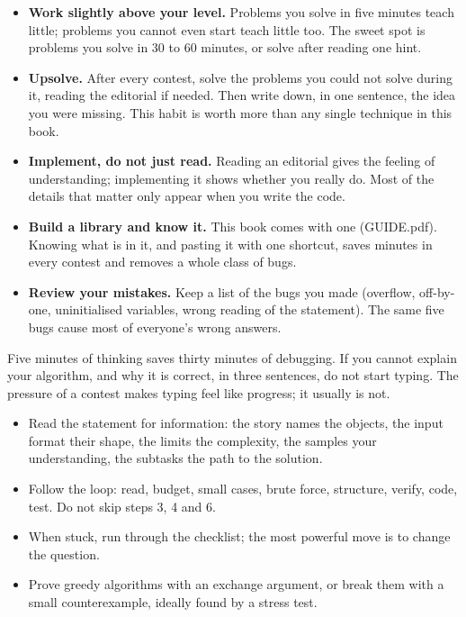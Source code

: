 \begin{itemize}
  \item \textbf{Work slightly above your level.} Problems you solve in five minutes teach little; problems you cannot even
        start teach little too. The sweet spot is problems you solve in 30 to 60 minutes, or solve after reading one hint.
  \item \textbf{Upsolve.} After every contest, solve the problems you could not solve during it, reading the editorial if
        needed. Then write down, in one sentence, the idea you were missing. This habit is worth more than any single
        technique in this book.
  \item \textbf{Implement, do not just read.} Reading an editorial gives the feeling of understanding; implementing it shows
        whether you really do. Most of the details that matter only appear when you write the code.
  \item \textbf{Build a library and know it.} This book comes with one (GUIDE.pdf). Knowing what is in it, and pasting it
        with one shortcut, saves minutes in every contest and removes a whole class of bugs.
  \item \textbf{Review your mistakes.} Keep a list of the bugs you made (overflow, off-by-one, uninitialised variables,
        wrong reading of the statement). The same five bugs cause most of everyone's wrong answers.
\end{itemize}

\begin{pitfall}
Five minutes of thinking saves thirty minutes of debugging. If you cannot explain your algorithm, and why it is correct, in
three sentences, do not start typing. The pressure of a contest makes typing feel like progress; it usually is not.
\end{pitfall}

\begin{summary}
\begin{itemize}
  \item Read the statement for information: the story names the objects, the input format their shape, the limits the
        complexity, the samples your understanding, the subtasks the path to the solution.
  \item Follow the loop: read, budget, small cases, brute force, structure, verify, code, test. Do not skip steps 3, 4 and 6.
  \item When stuck, run through the checklist; the most powerful move is to change the question.
  \item Prove greedy algorithms with an exchange argument, or break them with a small counterexample, ideally found by a
        stress test.
\end{itemize}
\end{summary}

